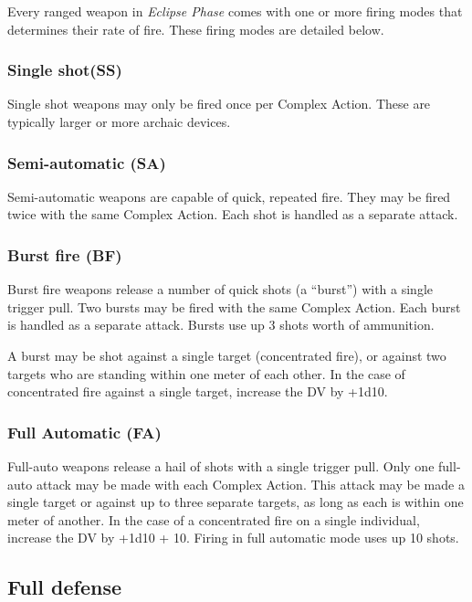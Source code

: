 Every ranged weapon in \emph{Eclipse Phase} comes with one or more firing modes that determines their rate of fire. These firing modes are detailed below.

\subsubsection{Single shot(SS)}

Single shot weapons may only be fired once per Complex Action. These are typically larger or more archaic devices.

\subsubsection{Semi-automatic (SA)}

Semi-automatic weapons are capable of quick, repeated fire. They may be fired twice with the same Complex Action. Each shot is handled as a separate attack.

\subsubsection{Burst fire (BF)}

Burst fire weapons release a number of quick shots (a ``burst”) with a single trigger pull. Two bursts may be fired with the same Complex Action. Each burst is handled as a separate attack. Bursts use up 3 shots worth of ammunition.

A burst may be shot against a single target (concentrated fire), or against two targets who are standing within one meter of each other. In the case of concentrated fire against a single target, increase the DV by +1d10.

\subsubsection{Full Automatic (FA)}

Full-auto weapons release a hail of shots with a single trigger pull. Only one full-auto attack may be made with each Complex Action. This attack may be made a single target or against up to three separate targets, as long as each is within one meter of another. In the case of a concentrated fire on a single individual, increase the DV by +1d10 + 10. Firing in full automatic mode uses up 10 shots.


\subsection{Full defense}
\label{sec:full-defense}

